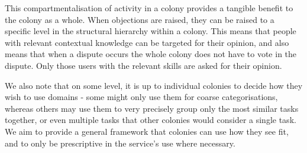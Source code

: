 This compartmentalisation of activity in a colony provides a tangible benefit to the colony as a whole. When objections are raised, they can be raised to a specific level in the structural hierarchy within a colony. This means that people with relevant contextual knowledge can be targeted for their opinion, and also means that when a dispute occurs the whole colony does not have to vote in the dispute. Only those users with the relevant skills are asked for their opinion.

We also note that on some level, it is up to individual colonies to decide how they wish to use domains - some might only use them for coarse categorisations, whereas others may use them to very precisely group only the most similar tasks together, or even multiple tasks that other colonies would consider a single task. We aim to provide a general framework that colonies can use how they see fit, and to only be prescriptive in the service’s use where necessary.


